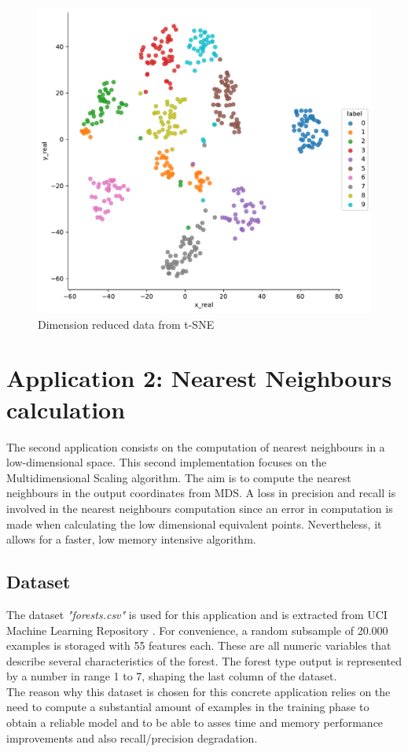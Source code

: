 \documentclass[a4paper,11pt,spanish]{report}
\begin{document}
\begin{figure}
\centering
\includegraphics[width=12cm]{figures/app1plotreal.pdf}
\caption{\label{figureTSNE}Dimension reduced data from t-SNE}
\end{figure}

\newpage

\section{Application 2: Nearest Neighbours calculation}
\label{sec:app2}

The second application consists on the computation of nearest neighbours in a low-dimensional space. This second implementation focuses on the Multidimensional Scaling algorithm. The aim is to compute the nearest neighbours in the output coordinates from MDS. A loss in precision and recall is involved in the nearest neighbours computation since an error in computation is made when calculating the low dimensional equivalent points. Nevertheless, it allows for a faster, low memory intensive algorithm.

\subsection{Dataset}
\label{ssec:data2}

The dataset \textit{"forests.csv"} is used for this application and is extracted from UCI Machine Learning Repository \citep{ucidata}. For convenience, a random subsample of 20.000 examples is storaged with 55 features each. These are all numeric variables that describe several characteristics of the forest. The forest type output is represented by a number in range 1 to 7, shaping the last column of the dataset.\\
The reason why this dataset is chosen for this concrete application relies on the need to compute a substantial amount of examples in the training phase to obtain a reliable model and to be able to asses time and memory performance improvements and also recall/precision degradation.
\end{document}
